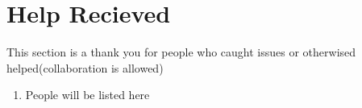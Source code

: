 \section{Help Recieved}
This section is a thank you for people who caught issues or otherwised helped(collaboration is allowed)
\begin{enumerate}
\item People will be listed here
\end{enumerate}